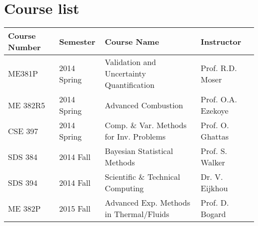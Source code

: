 \section{Course list}

\begin{table}[h]
\centering
\doublespacing
\begin{tabular}{llll}
\hline \hline
Course Number & Semester & Course Name & Instructor \\ 
\hline 
ME381P   & 2014 Spring   & Validation and Uncertainty Quantification &
	     Prof. R.D. Moser \\
ME 382R5 & 2014 Spring   & Advanced Combustion & Prof. O.A. Ezekoye \\
CSE 397  & 2014 Spring   &  Comp. \& Var. Methods for
	 Inv. Problems & Prof. O. Ghattas \\
SDS 384  & 2014 Fall   & Bayesian Statistical Methods & Prof. S.
	     Walker \\
SDS 394  & 2014 Fall   & Scientific \& Technical Computing & Dr. V. Eijkhou \\
ME 382P  & 2015 Fall   & Advanced Exp. Methods in Thermal/Fluids
	 & Prof. D. Bogard \\  
\hline \hline
\end{tabular} 
\end{table}
